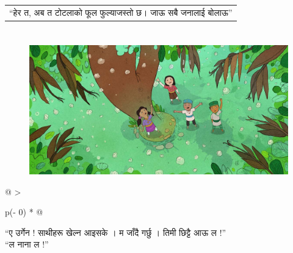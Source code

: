 \documentclass[
  letterpaper,
  DIV=11,
  numbers=noendperiod,
  paper=6in:9in,
  pagesize=pdftex,
  headinclude=on,
  footinclude=on,
  12pt]{scrreprt}
\begin{document}
\hypertarget{p}{}
\begin{longtable}[]{@{}l@{}}
\toprule\noalign{}
\endhead
\bottomrule\noalign{}
\endlastfoot
``हेर त, अब त टोटलाको फूल फुल्‍याजस्तो छ। जाऊ सबै जनालाई बोलाऊ'' \\
\end{longtable}


\hypertarget{section-6}{%
\chapter{}\label{section-6}}

\hypertarget{img}{}
\begin{figure}[H]

{\centering \includegraphics{images/p-8.jpg}

}

\end{figure}

\hypertarget{p}{}
\begin{longtable}[]{@{}
  >{\raggedright\arraybackslash}p{(\columnwidth - 0\tabcolsep) * }@{}}
\toprule\noalign{}
\endhead
\bottomrule\noalign{}
\endlastfoot
\begin{minipage}[t]{\linewidth}\raggedright
``ए उर्गेन ! साथीहरू खेल्न आइसके । म जाँदै गर्छु । तिमी छिट्टै आऊ ल !''\\
``ल नाना ल !''\strut
\end{minipage} \\
\end{longtable}


\hypertarget{section-7}{%
\chapter{}\label{section-7}}
\end{document}
